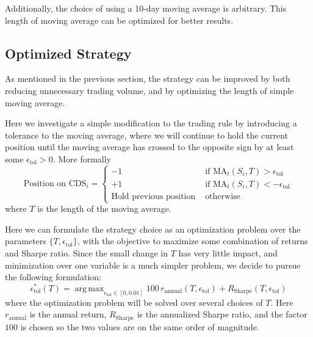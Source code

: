 \documentclass[11pt]{article}
\theoremstyle{definition}
\DeclareMathOperator*{\argmax}{arg\,max}
\begin{document}
Additionally, the choice of
using a 10-day moving average is arbitrary.
This length of moving average 
can be optimized for better results.












\subsection{Optimized Strategy}

As mentioned in the previous section, 
the strategy can be improved by both reducing 
unnecessary trading volume, 
and by optimizing the length of simple moving average.

Here we investigate a simple modification to 
the trading rule by introducing a tolerance to 
the moving average,
where we will continue to hold the current position 
until the moving average has crossed to 
the opposite sign by at least some 
$\epsilon_\text{tol} > 0$.
More formally
%
\begin{equation*}
  \text{Position on CDS}_i =
  \begin{cases}
    -1 & \text{ if MA}_t(S_i,T) > \epsilon_\text{tol} \\
    +1 & \text{ if MA}_t(S_i,T) < -\epsilon_\text{tol} \\
    \text{Hold previous position} & \text{ otherwise}
  \end{cases}
\end{equation*}
%
where $T$ is the length of the moving average.

Here we can formulate the strategy choice as 
an optimization problem over 
the parameters $\{T, \epsilon_\text{tol}\}$,
with the objective to maximize some combination 
of returns and Sharpe ratio.
Since the small change in $T$ has very little impact, 
and minimization over one variable is a much simpler problem,
we decide to pursue the following formulation:
%
\begin{equation} \label{eq:optimization}
  \epsilon_\text{tol}^*(T) = 
  \argmax_{\epsilon_\text{tol} \in [0, 0.01]}
    100\, r_\text{annual}(T,\epsilon_\text{tol}) + 
    R_\text{Sharpe}(T,\epsilon_\text{tol})
\end{equation}
%
where the optimization problem will be solved 
over several choices of $T$.
Here $r_\text{annual}$ is the annual return,
$R_\text{Sharpe}$ is the annualized Sharpe ratio,
and the factor $100$ is chosen so the two values 
are on the same order of magnitude.
\end{document}
